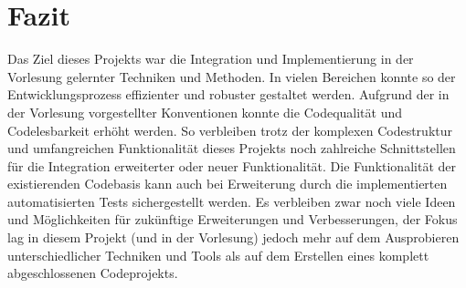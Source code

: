 \chapter{Fazit}
\label{ch:fazit}
Das Ziel dieses Projekts war die Integration und Implementierung in der Vorlesung gelernter Techniken und Methoden.
In vielen Bereichen konnte so der Entwicklungsprozess effizienter und robuster gestaltet werden.
Aufgrund der in der Vorlesung vorgestellter Konventionen konnte die Codequalität und Codelesbarkeit erhöht werden.
So verbleiben trotz der komplexen Codestruktur und umfangreichen Funktionalität dieses Projekts noch zahlreiche Schnittstellen für die Integration erweiterter oder neuer Funktionalität.
Die Funktionalität der existierenden Codebasis kann auch bei Erweiterung durch die implementierten automatisierten Tests sichergestellt werden.
Es verbleiben zwar noch viele Ideen und Möglichkeiten für zukünftige Erweiterungen und Verbesserungen, der Fokus lag in diesem Projekt (und in der Vorlesung) jedoch mehr auf dem Ausprobieren unterschiedlicher Techniken und Tools als auf dem Erstellen eines komplett abgeschlossenen Codeprojekts.
